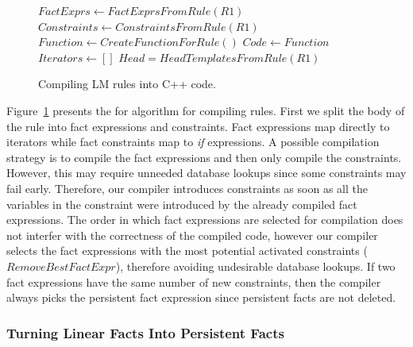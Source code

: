 \begin{figure}
\begin{algorithm}[H]
 $FactExprs \longleftarrow FactExprsFromRule(R1)$\;
 $Constraints \longleftarrow ConstraintsFromRule(R1)$\;
 $Function \longleftarrow CreateFunctionForRule()$\;
 $Code \longleftarrow Function$\;
 $Iterators \longleftarrow []$\;
 $Head = HeadTemplatesFromRule(R1)$\;
\end{algorithm}
 \caption{Compiling LM rules into C++ code.}
 \label{alg:compile_rule}
\end{figure}

Figure~\ref{alg:compile_rule} presents the for algorithm for compiling rules.
First we split the body of the rule into fact expressions and constraints. Fact
expressions map directly to iterators while fact constraints map to \emph{if}
expressions. A possible compilation strategy is to compile the fact expressions
and then only compile the constraints. However, this may require unneeded
database lookups since some constraints may fail early. Therefore, our compiler
introduces constraints as soon as all the variables in the constraint were
introduced by the already compiled fact expressions. The order in which fact
expressions are selected for compilation does not interfer with the correctness
of the compiled code, however our compiler selects the fact expressions with the
most potential activated constraints ($RemoveBestFactExpr$), therefore avoiding
undesirable database lookups. If two fact expressions have the same number of
new constraints, then the compiler always picks the persistent fact expression
since persistent facts are not deleted.

\subsubsection{Turning Linear Facts Into Persistent Facts}

